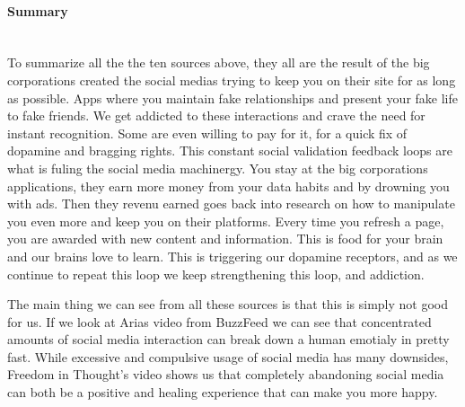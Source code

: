 \documentclass[11pt]{article}
\begin{document}
\paragraph{Summary} \hspace{0pt} \\
To summarize all the the ten sources above, they all are the result of the big
corporations created the social medias trying to keep you on their site for as long as
possible. Apps where you maintain fake relationships and present your fake life to fake
friends.  We get addicted to these interactions and crave the need for instant
recognition. Some are even willing to pay for it, for a quick fix of dopamine and
bragging rights. This constant social validation feedback loops are what is fuling the
social media machinergy. You stay at the big corporations applications, they earn more
money from your data habits and by drowning you with ads. Then they revenu earned goes
back into research on how to manipulate you even more and keep you on their platforms.
Every time you refresh a page, you are awarded with new content and information. This
is food for your brain and our brains love to learn. This is triggering our dopamine
receptors, and as we continue to repeat this loop we keep strengthening this loop, and
addiction.

The main thing we can see from all these sources is that this is simply not good for us.
If we look at Arias video from BuzzFeed we can see that concentrated amounts of social
media interaction can break down a human emotialy in pretty fast. While excessive and
compulsive usage of social media has many downsides, Freedom in Thought’s video shows
us that completely abandoning social media can both be a positive and healing experience
that can make you more happy.

\pagebreak


\end{document}
